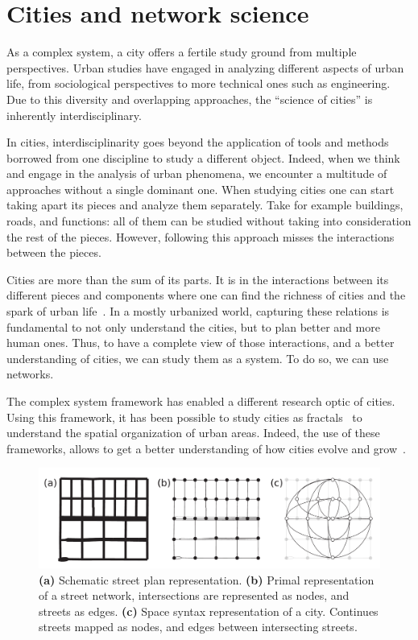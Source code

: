 \section{Cities and network science}


As a complex system, a city offers a fertile study ground from multiple perspectives. Urban studies have engaged in analyzing different aspects of urban life, from sociological perspectives to more technical ones such as engineering. Due to this diversity and overlapping approaches, the ``science of cities'' is inherently interdisciplinary.

In cities, interdisciplinarity goes beyond the application of tools and methods borrowed from one discipline to study a different object. Indeed, when we think and engage in the analysis of urban phenomena, we encounter a multitude of approaches without a single dominant one. When studying cities one can start taking apart its pieces and analyze them separately. Take for example buildings, roads, and functions: all of them can be studied without taking into consideration the rest of the pieces. However, following this approach misses the interactions between the pieces. 

Cities are more than the sum of its parts. It is in the interactions between its different pieces and components where one can find the richness of cities and the spark of urban life~\cite{Jacobs1961Death}. In a mostly urbanized world, capturing these relations is fundamental to not only understand the cities, but to plan better and more human ones. Thus, to have a complete view of those interactions, and a better understanding of cities, we can study them as a system. To do so, we can use networks.

The complex system framework has enabled a different research optic of cities. Using this framework, it has been possible to study cities as fractals~\cite{batty1996preliminary} to understand the spatial organization of urban areas. Indeed, the use of these frameworks, allows to get a better understanding of how cities evolve and grow~\cite{makse1995growth}. %

\begin{figure}[th!]
	\centering
	\includegraphics[width=\textwidth]{images/introduction/networks.pdf}
	\caption[Network representation of a city]{\textbf{(a)} Schematic street plan representation. \textbf{(b)} Primal representation of a street network, intersections are represented as nodes, and streets as edges. \textbf{(c)} Space syntax representation of a city. Continues streets mapped as nodes, and edges between intersecting streets.}
	\label{fig:networks}
\end{figure}

